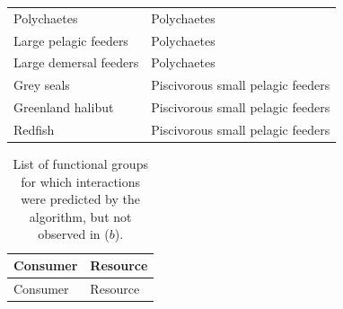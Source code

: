 \begin{singlespace}
\begin{longtable}{ p{} p{} }
    Polychaetes            & Polychaetes    \\
    Large pelagic feeders  & Polychaetes    \\
    Large demersal feeders & Polychaetes    \\
    Grey seals             & Piscivorous small pelagic feeders  \\
    Greenland halibut      & Piscivorous small pelagic feeders  \\
    Redfish                & Piscivorous small pelagic feeders  \\
    \bottomrule
  \end{longtable}

  \begin{longtable}{ p{} p{} }
  \caption{List of functional groups for which interactions were predicted by the algorithm, but not observed in \citet{savenkoff2004} ($b$).}
  \label{ch2-tbl3}
  \tabularnewline
    \toprule
      Consumer               & Resource \\
    \hline    \hline
    \endfirsthead

    \toprule
      Consumer               & Resource \\
    \hline    \hline
    \endhead


\end{longtable}
\end{singlespace}
